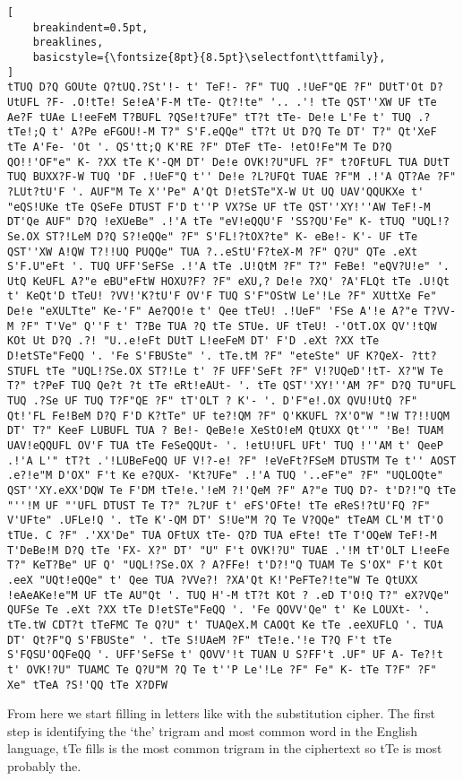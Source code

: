\documentclass{uva-inf-bachelor-thesis}
\begin{document}
\begin{lstlisting}[
    breakindent=0.5pt,
    breaklines,
    basicstyle={\fontsize{8pt}{8.5pt}\selectfont\ttfamily},
]
tTUQ D?Q GOUte Q?tUQ.?St'!- t' TeF!- ?F" TUQ .!UeF"QE ?F" DUtT'Ot D?UtUFL ?F- .O!tTe! Se!eA'F-M tTe- Qt?!te" '.. .'! tTe QST''XW UF tTe Ae?F tUAe L!eeFeM T?BUFL ?QSe!t?UFe" tT?t tTe- De!e L'Fe t' TUQ .?tTe!;Q t' A?Pe eFGOU!-M T?" S'F.eQQe" tT?t Ut D?Q Te DT' T?" Qt'XeF tTe A'Fe- 'Ot '. QS'tt;Q K'RE ?F" DTeF tTe- !etO!Fe"M Te D?Q QO!!'OF"e" K- ?XX tTe K'-QM DT' De!e OVK!?U"UFL ?F" t?OFtUFL TUA DUtT TUQ BUXX?F-W TUQ 'DF .!UeF"Q t'' De!e ?L?UFQt TUAE ?F"M .!'A QT?Ae ?F" ?LUt?tU'F '. AUF"M Te X''Pe" A'Qt D!etSTe"X-W Ut UQ UAV'QQUKXe t' "eQS!UKe tTe QSeFe DTUST F'D t''P VX?Se UF tTe QST''XY!''AW TeF!-M DT'Qe AUF" D?Q !eXUeBe" .!'A tTe "eV!eQQU'F 'SS?QU'Fe" K- tTUQ "UQL!?Se.OX ST?!LeM D?Q S?!eQQe" ?F" S'FL!?tOX?te" K- eBe!- K'- UF tTe QST''XW A!QW T?!!UQ PUQQe" TUA ?..eStU'F?teX-M ?F" Q?U" QTe .eXt S'F.U"eFt '. TUQ UFF'SeFSe .!'A tTe .U!QtM ?F" T?" FeBe! "eQV?U!e" '. UtQ KeUFL A?"e eBU"eFtW HOXU?F? ?F" eXU,? De!e ?XQ' ?A'FLQt tTe .U!Qt t' KeQt'D tTeU! ?VV!'K?tU'F OV'F TUQ S'F"OStW Le'!Le ?F" XUttXe Fe" De!e "eXULTte" Ke-'F" Ae?QO!e t' Qee tTeU! .!UeF" 'FSe A'!e A?"e T?VV-M ?F" T'Ve" Q''F t' T?Be TUA ?Q tTe STUe. UF tTeU! -'OtT.OX QV'!tQW KOt Ut D?Q .?! "U..e!eFt DUtT L!eeFeM DT' F'D .eXt ?XX tTe D!etSTe"FeQQ '. 'Fe S'FBUSte" '. tTe.tM ?F" "eteSte" UF K?QeX- ?tt?STUFL tTe "UQL!?Se.OX ST?!Le t' ?F UFF'SeFt ?F" V!?UQeD'!tT- X?"W Te T?" t?PeF TUQ Qe?t ?t tTe eRt!eAUt- '. tTe QST''XY!''AM ?F" D?Q TU"UFL TUQ .?Se UF TUQ T?F"QE ?F" tT'OLT ? K'- '. D'F"e!.OX QVU!UtQ ?F" Qt!'FL Fe!BeM D?Q F'D K?tTe" UF te?!QM ?F" Q'KKUFL ?X'O"W "!W T?!!UQM DT' T?" KeeF LUBUFL TUA ? Be!- QeBe!e XeStO!eM QtUXX Qt''" 'Be! TUAM UAV!eQQUFL OV'F TUA tTe FeSeQQUt- '. !etU!UFL UFt' TUQ !''AM t' QeeP .!'A L'" tT?t .'!LUBeFeQQ UF V!?-e! ?F" !eVeFt?FSeM DTUSTM Te t'' AOST .e?!e"M D'OX" F't Ke e?QUX- 'Kt?UFe" .!'A TUQ '..eF"e" ?F" "UQLOQte" QST''XY.eXX'DQW Te F'DM tTe!e.'!eM ?!'QeM ?F" A?"e TUQ D?- t'D?!"Q tTe "''!M UF "'UFL DTUST Te T?" ?L?UF t' eFS'OFte! tTe eReS!?tU'FQ ?F" V'UFte" .UFLe!Q '. tTe K'-QM DT' S!Ue"M ?Q Te V?QQe" tTeAM CL'M tT'O tTUe. C ?F" .'XX'De" TUA OFtUX tTe- Q?D TUA eFte! tTe T'OQeW TeF!-M T'DeBe!M D?Q tTe 'FX- X?" DT' "U" F't OVK!?U" TUAE .'!M tT'OLT L!eeFe T?" KeT?Be" UF Q' "UQL!?Se.OX ? A?FFe! t'D?!"Q TUAM Te S'OX" F't KOt .eeX "UQt!eQQe" t' Qee TUA ?VVe?! ?XA'Qt K!'PeFTe?!te"W Te QtUXX !eAeAKe!e"M UF tTe AU"Qt '. TUQ H'-M tT?t KOt ? .eD T'O!Q T?" eX?VQe" QUFSe Te .eXt ?XX tTe D!etSTe"FeQQ '. 'Fe QOVV'Qe" t' Ke LOUXt- '. tTe.tW CDT?t tTeFMC Te Q?U" t' TUAQeX.M CAOQt Ke tTe .eeXUFLQ '. TUA DT' Qt?F"Q S'FBUSte" '. tTe S!UAeM ?F" tTe!e.'!e T?Q F't tTe S'FQSU'OQFeQQ '. UFF'SeFSe t' QOVV'!t TUAN U S?FF't .UF" UF A- Te?!t t' OVK!?U" TUAMC Te Q?U"M ?Q Te t''P Le'!Le ?F" Fe" K- tTe T?F" ?F" Xe" tTeA ?S!'QQ tTe X?DFW   
\end{lstlisting}
\vspace{20pt}
From here we start filling in letters like with the substitution cipher.
The first step is identifying the `the' trigram and most common word in the
English language, tTe fills is the most common trigram in the ciphertext so tTe
is most probably the.
\end{document}
